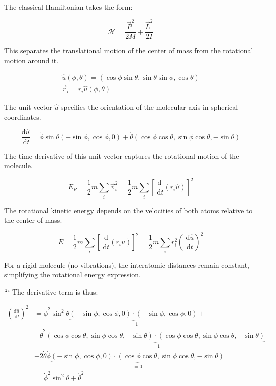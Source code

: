 \documentclass[10pt]{article}
\begin{document}
The classical Hamiltonian takes the form:

\begin{equation*}
\mathcal{H}=\frac{\vec{P}^{2}}{2 M}+\frac{\vec{L}^{2}}{2 I} \tag{8.63}
\end{equation*}

This separates the translational motion of the center of mass from the rotational motion around it.

\[
\begin{array}{r}
\hat{u}(\phi, \theta)=(\cos \phi \sin \theta, \sin \theta \sin \phi, \cos \theta)  \tag{8.64}\\
\vec{r}_{i}=r_{i} \hat{u}(\phi, \theta)
\end{array}
\]

The unit vector $\hat{u}$ specifies the orientation of the molecular axis in spherical coordinates.

\begin{equation*}
\frac{\mathrm{d} \hat{u}}{\mathrm{~d} t}=\dot{\phi} \sin \theta(-\sin \phi, \cos \phi, 0)+\dot{\theta}(\cos \phi \cos \theta, \sin \phi \cos \theta,-\sin \theta) \tag{8.65}
\end{equation*}

The time derivative of this unit vector captures the rotational motion of the molecule.

\begin{equation*}
E_{R}=\frac{1}{2} m \sum_{i} \vec{v}_{i}^{2}=\frac{1}{2} m \sum_{i}\left[\frac{\mathrm{d}}{\mathrm{~d} t}\left(r_{i} \hat{u}\right)\right]^{2} \tag{8.66}
\end{equation*}

The rotational kinetic energy depends on the velocities of both atoms relative to the center of mass.

\begin{equation*}
E=\frac{1}{2} m \sum_{i}\left[\frac{\mathrm{~d}}{\mathrm{~d} t}\left(r_{i} \hat{u}\right)\right]^{2}=\frac{1}{2} m \sum_{i} r_{i}^{2}\left(\frac{\mathrm{~d} \hat{u}}{\mathrm{~d} t}\right)^{2} \tag{8.67}
\end{equation*}

For a rigid molecule (no vibrations), the interatomic distances remain constant, simplifying the rotational energy expression.

```
The derivative term is thus:

\begin{align*}
\left(\frac{\mathrm{d} \hat{u}}{\mathrm{~d} t}\right)^{2} & =\dot{\phi}^{2} \sin ^{2} \theta \underbrace{(-\sin \phi, \cos \phi, 0) \cdot(-\sin \phi, \cos \phi, 0)}_{=1}+ \\
& +\dot{\theta}^{2} \underbrace{(\cos \phi \cos \theta, \sin \phi \cos \theta,-\sin \theta) \cdot(\cos \phi \cos \theta, \sin \phi \cos \theta,-\sin \theta)}_{=1}+ \\
& +2 \dot{\theta} \dot{\phi} \underbrace{(-\sin \phi, \cos \phi, 0) \cdot(\cos \phi \cos \theta, \sin \phi \cos \theta,-\sin \theta)}_{=0}= \\
& =\dot{\phi}^{2} \sin ^{2} \theta+\dot{\theta}^{2} \tag{8.68}
\end{align*}
\end{document}
